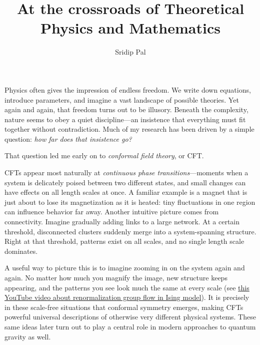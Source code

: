 \documentclass[11pt, oneside]{article}
\title{At the crossroads of Theoretical Physics and Mathematics}
\author{Sridip Pal}
\date{}
\begin{document}
	
\maketitle



Physics often gives the impression of endless freedom. We write down equations, introduce parameters,
and imagine a vast landscape of possible theories. Yet again and again, that freedom turns out to be
illusory. Beneath the complexity, nature seems to obey a quiet discipline—an insistence that everything must 
fit together without contradiction. Much of my research has been driven by a simple question:
\emph{how far does that insistence go?}



That question led me early on to \emph{conformal field theory}, or CFT. 




CFTs appear most naturally at \emph{continuous phase transitions}—moments when a system is delicately
poised between two different states, and small changes can have effects on all length scales at once.
A familiar example is a magnet that is just about to lose its magnetization as it is heated: tiny
fluctuations in one region can influence behavior far away. Another intuitive picture comes from
connectivity. Imagine gradually adding links to a large network. At a certain threshold, disconnected
clusters suddenly merge into a system-spanning structure. Right at that threshold, patterns exist on
all scales, and no single length scale dominates.



A useful way to picture this is to imagine zooming in on the system again and again. No matter
how much you magnify the image, new structure keeps appearing, and the patterns you see look much the
same at every scale (see \href{https://www.youtube.com/watch?v=MxRddFrEnPc}{this YouTube video about renormalization group flow in Ising model}).  It is precisely in these scale-free situations that conformal symmetry emerges,
making CFTs powerful universal descriptions of otherwise very different physical systems. These same
ideas later turn out to play a central role in modern approaches to quantum gravity as well.
\end{document}
